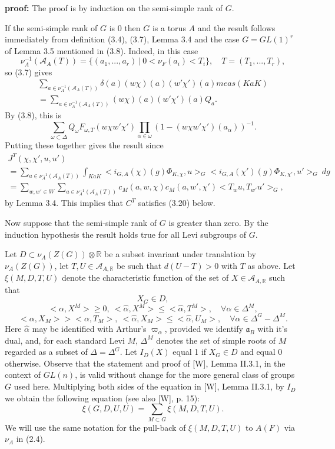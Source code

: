 \documentclass[12pt]{article}
\newenvironment{pf}[1][proof:]{\par\medskip\noindent\textbf{#1} }{\par\medskip}
\begin{document}
\begin{pf}
The proof is by induction on the semi-simple rank of $G$.

If the semi-simple rank of $G$ is 0 then $G$ is a torus $A$ and the result follows immediately from definition (3.4), (3.7), Lemma 3.4 and the case $G=GL(1)^r$ of Lemma 3.5 mentioned in (3.8). Indeed, in this case
\[
\nu_A^{-1}(\mathcal{A}_A(T))=\{(a_1,...,a_r)\ |\ 0<\nu_F(a_i)<T_i\},\quad T=(T_1,...,T_r),
\]
so (3.7) gives
\begin{equation}\tag{3.9}
\begin{array}{c}
\sum_{a\in\nu_A^{-1}(\mathcal{A}_A(T))}\delta(a)(w\chi)(a)(w'\chi')(a)meas(KaK)\\
=\sum_{a\in\nu_A^{-1}(\mathcal{A}_A(T))}(w\chi)(a)(w'\chi')(a)Q_a.
\end{array}
\end{equation}
By (3.8), this is
\begin{equation}\tag{3.10}
\sum_{\omega\subset\Delta}Q_\omega F_{\omega,T}(w\chi w'\chi')\prod_{\alpha\in\omega}(1-(w\chi w'\chi')(a_\alpha))^{-1}.
\end{equation}
Putting these together gives the result since
\[
\begin{array}{c}
J^T(\chi,\chi',u,u')\\
=\sum_{a\in\nu_A^{-1}(\mathcal{A}_A(T))}\int_{KaK}<i_{G,A}(\chi)(g)\Phi_{K,\chi},u>_G<i_{G,A}(\chi')(g)\Phi_{K,\chi'},u'>_G\ dg\\
=\sum_{w,w'\in W}\sum_{a\in\nu_A^{-1}(\mathcal{A}_A(T))}c_M(a,w,\chi)c_M(a,w',\chi')<T_wu,T_{w'}u'>_G,
\end{array}
\]
by Lemma 3.4. This implies that $C^T$ satisfies (3.20) below.

Now suppose that the semi-simple rank of $G$ is greater than zero. By the induction hypothesis the result holds true for all Levi subgroups of $G$.

Let $D\subset\nu_A(Z(G))\otimes\mathbb{R}$ be a subset invariant under translation by $\nu_A(Z(G))$, let $T,U\in\mathcal{A}_{A,\mathbb{R}}$ be such that $d(U-T)>0$ with $T$ as above. Let $\xi(M,D,T,U)$ denote the characteristic function of the set of $X\in\mathcal{A}_{A,\mathbb{R}}$ such that
\[
X_G\in D,
\]
\[
<\alpha,X^M>\geq0,\ <\hat\alpha,X^M>\leq<\hat\alpha,T^M>,\quad\forall\alpha\in\Delta^M,
\]
\[
<\alpha,X_M>><\alpha,T_M>,\ <\hat\alpha,X_M>\leq<\hat\alpha,U_M>,\quad\forall\alpha\in\Delta^G-\Delta^M.
\]
Here $\hat\alpha$ may be identified with Arthur's $\varpi_\alpha$, provided we identify $\mathfrak{a}_B$ with it's dual, and, for each standard Levi $M$, $\Delta^M$ denotes the set of simple roots of $M$ regarded as a subset of $\Delta=\Delta^G$. Let $I_D(X)$ equal 1 if $X_G\in D$ and equal 0 otherwise. Observe that the statement and proof of [W], Lemma II.3.1, in the context of $GL(n)$, is valid without change for the more general class of groups $G$ used here. Multiplying both sides of the equation in [W], Lemma II.3.1, by $I_D$ we obtain the following equation (see also [W], p. 15):
\[
\xi(G,D,U,U)=\sum_{M\subset G}\xi(M,D,T,U).
\]
We will use the same notation for the pull-back of $\xi(M,D,T,U)$ to $A(F)$ via $\nu_A$ in (2.4).


\end{pf}
\end{document}
